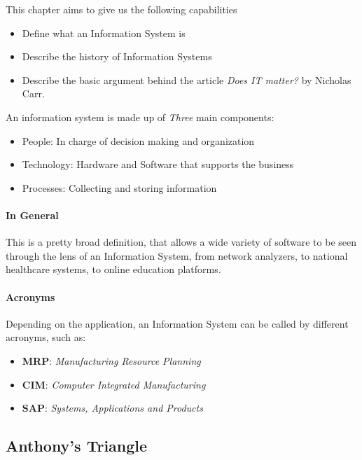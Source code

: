 \documentclass[openright, twoside, twocolumn]{report}
\begin{document}
    This chapter aims to give us the following capabilities

    \begin{itemize}
      \item Define what an Information System is
      \item Describe the history of Information Systems
      \item Describe the basic argument behind the article \emph{Does IT matter?} by Nicholas Carr.
    \end{itemize}

    An information system is made up of \emph{Three} main components:

    \begin{itemize}
      \item People: In charge of decision making and organization
      \item Technology: Hardware and Software that supports the business
      \item Processes: Collecting and storing information
    \end{itemize}

    \paragraph{In General}
    This is a pretty broad definition, that allows a wide variety of software to be seen through the lens of an Information System,
    from network analyzers, to national healthcare systems, to online education platforms.

    \paragraph{Acronyms}
    Depending on the application, an Information System can be called by different acronyms, such as:

    \begin{itemize}
      \item \textbf{MRP}: \emph{Manufacturing Resource Planning}
      \item \textbf{CIM}: \emph{Computer Integrated Manufacturing}
      \item \textbf{SAP}: \emph{Systems, Applications and Products}
    \end{itemize}

    \subsection{Anthony's Triangle}
\end{document}
